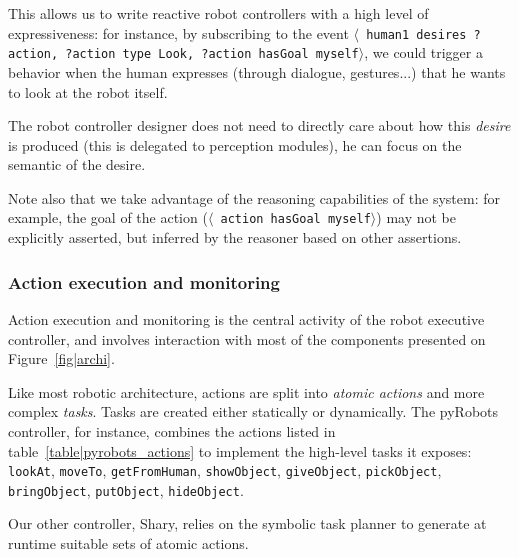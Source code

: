\documentclass[preprint,3p,times]{elsarticle}
\newcommand{\stmt}[1]{{\footnotesize \tt $\langle$ #1\relax$\rangle$}}
\begin{document}
This allows us to write reactive robot controllers with a high level of
expressiveness: for instance, by subscribing to the event \stmt{human1 desires
?action, ?action type Look, ?action hasGoal myself}, we could trigger a
behavior when the human expresses (through dialogue, gestures...) that he
wants to look at the robot itself.

The robot controller designer does not need to directly care about how this
\emph{desire} is produced (this is delegated to perception modules), he can
focus on the semantic of the desire.

Note also that we take advantage of the reasoning capabilities of the system:
for example, the goal of the action (\stmt{action hasGoal myself}) may not be
explicitly asserted, but inferred by the reasoner based on other assertions.

\subsubsection{Action execution and monitoring}\label{sec:action}

Action execution and monitoring is the central activity of the robot executive
controller, and involves interaction with most of the components presented on
Figure~\ref{fig|archi}.

Like most robotic architecture, actions are split into \emph{atomic actions}
and more complex \emph{tasks}. Tasks are created either statically or dynamically.
The {\sc pyRobots} controller, for instance, combines the actions listed in
table~\ref{table|pyrobots_actions} to implement the high-level tasks it exposes: {\tt
lookAt}, {\tt moveTo}, {\tt getFromHuman}, {\tt showObject}, {\tt giveObject},
{\tt pickObject}, {\tt bringObject}, {\tt putObject}, {\tt hideObject}.

Our other controller, {\sc Shary}, relies on the symbolic task planner to
generate at runtime suitable sets of atomic actions.
\end{document}
